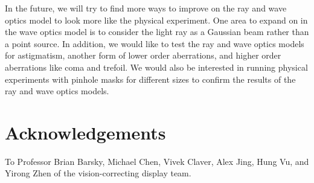 \documentclass{acmsiggraph}
\begin{document}
In the future, we will try to find more ways to improve on the ray and wave optics model to look more like the physical experiment. One area to expand on in the wave optics model is to consider the light ray as a Gaussian beam rather than a point source. In addition, we would like to test the ray and wave optics models for astigmatism, another form of lower order aberrations, and higher order aberrations like coma and trefoil. We would also be interested in running physical experiments with pinhole masks for different sizes to confirm the results of the ray and wave optics models. 


\section*{Acknowledgements}

To Professor Brian Barsky, Michael Chen, Vivek Claver, Alex Jing, Hung Vu, and Yirong Zhen of the vision-correcting display team.


\nocite{*}

\end{document}
